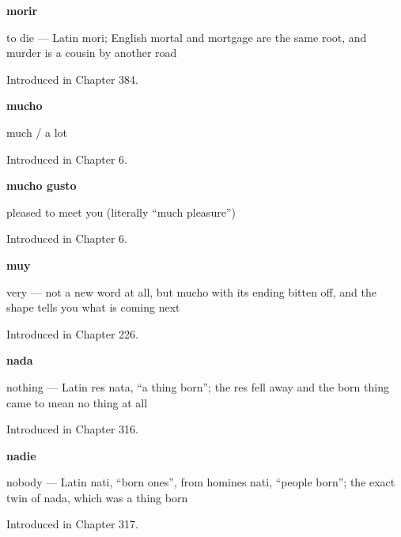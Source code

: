 \noindent\begin{minipage}[t]{\linewidth}
\raggedright
\textbf{morir}\par
\small to die — Latin mori; English mortal and mortgage are the same root, and murder is a cousin by another road\par
\footnotesize Introduced in Chapter 384.
\end{minipage}\par\medskip

\noindent\begin{minipage}[t]{\linewidth}
\raggedright
\textbf{mucho}\par
\small much / a lot\par
\footnotesize Introduced in Chapter 6.
\end{minipage}\par\medskip

\noindent\begin{minipage}[t]{\linewidth}
\raggedright
\textbf{mucho gusto}\par
\small pleased to meet you (literally \textquotedblleft{}much pleasure\textquotedblright{})\par
\footnotesize Introduced in Chapter 6.
\end{minipage}\par\medskip

\noindent\begin{minipage}[t]{\linewidth}
\raggedright
\textbf{muy}\par
\small very — not a new word at all, but mucho with its ending bitten off, and the shape tells you what is coming next\par
\footnotesize Introduced in Chapter 226.
\end{minipage}\par\medskip

\noindent\begin{minipage}[t]{\linewidth}
\raggedright
\textbf{nada}\par
\small nothing — Latin res nata, \textquotedblleft{}a thing born\textquotedblright{}; the res fell away and the born thing came to mean no thing at all\par
\footnotesize Introduced in Chapter 316.
\end{minipage}\par\medskip

\noindent\begin{minipage}[t]{\linewidth}
\raggedright
\textbf{nadie}\par
\small nobody — Latin nati, \textquotedblleft{}born ones\textquotedblright{}, from homines nati, \textquotedblleft{}people born\textquotedblright{}; the exact twin of nada, which was a thing born\par
\footnotesize Introduced in Chapter 317.
\end{minipage}\par\medskip


